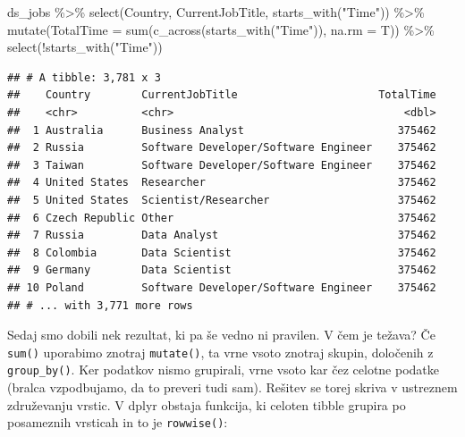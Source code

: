 \documentclass[
]{book}
\newenvironment{Shaded}{\begin{snugshade}}{\end{snugshade}}
\newcommand{\AttributeTok}[1]{\textcolor[rgb]{0.77,0.63,0.00}{#1}}
\newcommand{\FunctionTok}[1]{\textcolor[rgb]{0.00,0.00,0.00}{#1}}
\newcommand{\NormalTok}[1]{#1}
\newcommand{\SpecialCharTok}[1]{\textcolor[rgb]{0.00,0.00,0.00}{#1}}
\newcommand{\StringTok}[1]{\textcolor[rgb]{0.31,0.60,0.02}{#1}}
\begin{document}
\begin{Shaded}
\begin{Highlighting}[]
\NormalTok{ds\_jobs }\SpecialCharTok{\%\textgreater{}\%}
  \FunctionTok{select}\NormalTok{(Country, CurrentJobTitle, }\FunctionTok{starts\_with}\NormalTok{(}\StringTok{"Time"}\NormalTok{)) }\SpecialCharTok{\%\textgreater{}\%}
  \FunctionTok{mutate}\NormalTok{(}\AttributeTok{TotalTime =} \FunctionTok{sum}\NormalTok{(}\FunctionTok{c\_across}\NormalTok{(}\FunctionTok{starts\_with}\NormalTok{(}\StringTok{"Time"}\NormalTok{)), }\AttributeTok{na.rm =}\NormalTok{ T)) }\SpecialCharTok{\%\textgreater{}\%}
  \FunctionTok{select}\NormalTok{(}\SpecialCharTok{!}\FunctionTok{starts\_with}\NormalTok{(}\StringTok{"Time"}\NormalTok{))}
\end{Highlighting}
\end{Shaded}

\begin{verbatim}
## # A tibble: 3,781 x 3
##    Country        CurrentJobTitle                      TotalTime
##    <chr>          <chr>                                    <dbl>
##  1 Australia      Business Analyst                        375462
##  2 Russia         Software Developer/Software Engineer    375462
##  3 Taiwan         Software Developer/Software Engineer    375462
##  4 United States  Researcher                              375462
##  5 United States  Scientist/Researcher                    375462
##  6 Czech Republic Other                                   375462
##  7 Russia         Data Analyst                            375462
##  8 Colombia       Data Scientist                          375462
##  9 Germany        Data Scientist                          375462
## 10 Poland         Software Developer/Software Engineer    375462
## # ... with 3,771 more rows
\end{verbatim}

Sedaj smo dobili nek rezultat, ki pa še vedno ni pravilen. V čem je težava? Če \texttt{sum()} uporabimo znotraj \texttt{mutate()}, ta vrne vsoto znotraj skupin, določenih z \texttt{group\_by()}. Ker podatkov nismo grupirali, vrne vsoto kar čez celotne podatke (bralca vzpodbujamo, da to preveri tudi sam). Rešitev se torej skriva v ustreznem združevanju vrstic. V dplyr obstaja funkcija, ki celoten tibble grupira po posameznih vrsticah in to je \texttt{rowwise()}:
\end{document}
